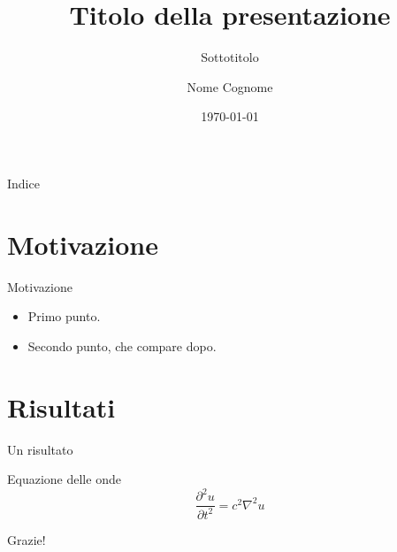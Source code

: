 \documentclass[aspectratio=169]{beamer}
\title{Titolo della presentazione}
\subtitle{Sottotitolo}
\author{Nome Cognome}
\institute{Istituzione}
\date{\today}
\begin{document}
\begin{frame}
  \titlepage
\end{frame}

\begin{frame}{Indice}
  \tableofcontents
\end{frame}

\section{Motivazione}

\begin{frame}{Motivazione}
  \begin{itemize}
    \item<1-> Primo punto.
    \item<2-> Secondo punto, che compare dopo.
  \end{itemize}
\end{frame}

\section{Risultati}

\begin{frame}{Un risultato}
  \begin{block}{Equazione delle onde}
    \[
      \frac{\partial^2 u}{\partial t^2} = c^2 \nabla^2 u
    \]
  \end{block}
\end{frame}

\begin{frame}
  \centering\Large Grazie!
\end{frame}
\end{document}
